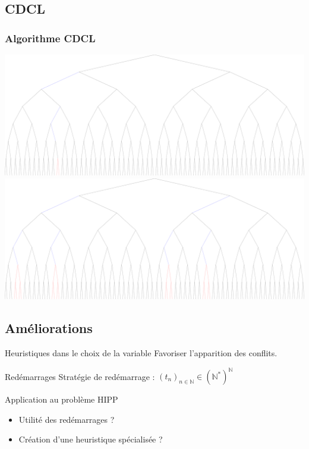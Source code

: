 \documentclass{beamer}
\begin{document}
\subsection{CDCL}
\begin{frame}
    \frametitle{Algorithme CDCL}
    \begin{center}
        \includegraphics[width=0.8\linewidth]{../reso/error.pdf} \\
        \vspace{1em}
        \includegraphics[width=0.8\linewidth]{../reso/eliminated.pdf}
    \end{center}
\end{frame}

\subsection{Améliorations}
\begin{frame}
    \begin{block}{Heuristiques dans le choix de la variable}
        Favoriser l'apparition des conflits.
    \end{block}

    \begin{block}{Redémarrages}
        Stratégie de redémarrage : $(t_n)_{n\in\mathbb{N}}\in(\mathbb{N}^*)^\mathbb{N}$
    \end{block}

    \begin{exampleblock}{Application au problème HIPP}
        \begin{itemize}
            \item Utilité des redémarrages ?
            \item Création d'une heuristique spécialisée ?
        \end{itemize}
    \end{exampleblock}
\end{frame}
\end{document}
